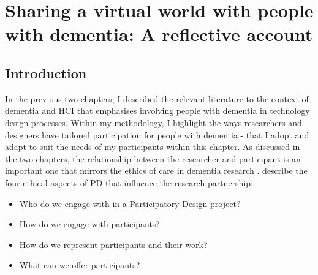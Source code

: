 \chapter{Sharing a virtual world with people with dementia: A reflective account}
\label{NegotatingReseacherParticipantRelationships}



\section{Introduction}
\label{Relationships:Introduction}
In the previous two chapters, I described the relevant literature to the context of dementia and HCI that emphasises involving people with dementia in technology design processes. Within my methodology, I highlight the ways researchers and designers have tailored participation for people with dementia - that I adopt and adapt to suit the needs of my participants within this chapter. As discussed in the two chapters, the relationship between the researcher and participant is an important one that mirrors the ethics of care in dementia research \cite{hamington_integrating_2019}. \cite{robertson2012ethics} describe the four ethical aspects of PD that influence the research partnership:
\begin{itemize}
\item Who do we engage with in a Participatory Design project?
\item How do we engage with participants?
\item How do we represent participants and their work?
\item What can we offer participants?
\end{itemize}

